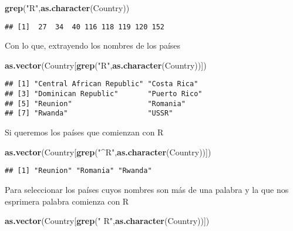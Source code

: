 \documentclass[]{article}
\newenvironment{Shaded}{\begin{snugshade}}{\end{snugshade}}
\newcommand{\KeywordTok}[1]{\textcolor[rgb]{0.13,0.29,0.53}{\textbf{#1}}}
\newcommand{\StringTok}[1]{\textcolor[rgb]{0.31,0.60,0.02}{#1}}
\newcommand{\NormalTok}[1]{#1}
\begin{document}
\begin{Shaded}
\begin{Highlighting}[]
\KeywordTok{grep}\NormalTok{(}\StringTok{"R"}\NormalTok{,}\KeywordTok{as.character}\NormalTok{(Country))}
\end{Highlighting}
\end{Shaded}

\begin{verbatim}
## [1]  27  34  40 116 118 119 120 152
\end{verbatim}

Con lo que, extrayendo los nombres de los países

\begin{Shaded}
\begin{Highlighting}[]
\KeywordTok{as.vector}\NormalTok{(Country[}\KeywordTok{grep}\NormalTok{(}\StringTok{"R"}\NormalTok{,}\KeywordTok{as.character}\NormalTok{(Country))])}
\end{Highlighting}
\end{Shaded}

\begin{verbatim}
## [1] "Central African Republic" "Costa Rica"              
## [3] "Dominican Republic"       "Puerto Rico"             
## [5] "Reunion"                  "Romania"                 
## [7] "Rwanda"                   "USSR"
\end{verbatim}

Si queremos los países que comienzan con R

\begin{Shaded}
\begin{Highlighting}[]
\KeywordTok{as.vector}\NormalTok{(Country[}\KeywordTok{grep}\NormalTok{(}\StringTok{"^R"}\NormalTok{,}\KeywordTok{as.character}\NormalTok{(Country))])}
\end{Highlighting}
\end{Shaded}

\begin{verbatim}
## [1] "Reunion" "Romania" "Rwanda"
\end{verbatim}

Para seleccionar los países cuyos nombres son más de una palabra y la
que nos esprimera palabra comienza con R

\begin{Shaded}
\begin{Highlighting}[]
\KeywordTok{as.vector}\NormalTok{(Country[}\KeywordTok{grep}\NormalTok{(}\StringTok{" R"}\NormalTok{,}\KeywordTok{as.character}\NormalTok{(Country))])}
\end{Highlighting}
\end{Shaded}
\end{document}
